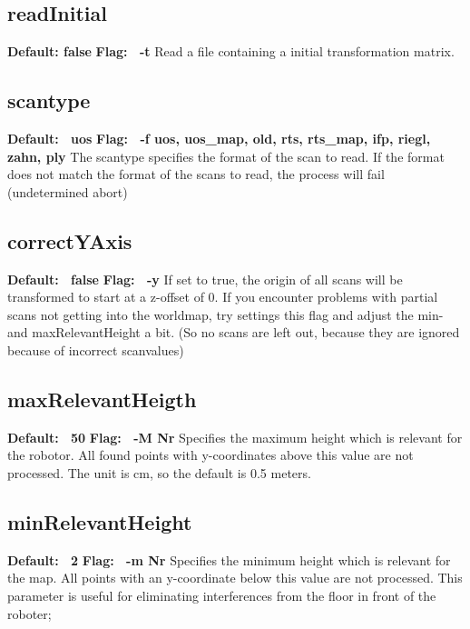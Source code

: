 \documentclass{article}
\begin{document}
\subsection{readInitial}
{\bf Default: false} \newline
{\bf Flag: \ -t} \newline
Read a file containing a initial transformation matrix.


\subsection{scantype}
{\bf Default: \ uos} \newline
{\bf Flag: \ -f {uos, uos_map, old, rts, rts_map, ifp, riegl, zahn, ply}} \newline
The scantype specifies the format of the scan to read. If the format does not
match the format of the scans to read, the process will fail (undetermined
abort)

\subsection{correctYAxis}
{\bf Default: \ false} \newline
{\bf Flag: \ -y} \newline
If set to true, the origin of all scans will be transformed to start at a
z-offset of 0. If you encounter problems with partial scans not getting into
the worldmap, try settings this flag and adjust the min- and maxRelevantHeight
a bit. (So no scans are left out, because they are ignored because of incorrect
scanvalues)

\subsection{maxRelevantHeigth}
{\bf Default: \ 50} \newline
{\bf Flag: \ -M Nr} \newline
Specifies the maximum height which is relevant for the robotor. All found
points with y-coordinates above this value are not processed.
The unit is cm, so the default is 0.5 meters.


\subsection{minRelevantHeight}
{\bf Default: \ 2} \newline
{\bf Flag: \ -m Nr} \newline
Specifies the minimum height which is relevant for the map. All points with an y-coordinate below this value are not processed. 
This parameter is useful for eliminating interferences from the floor in front of the roboter;
\end{document}
